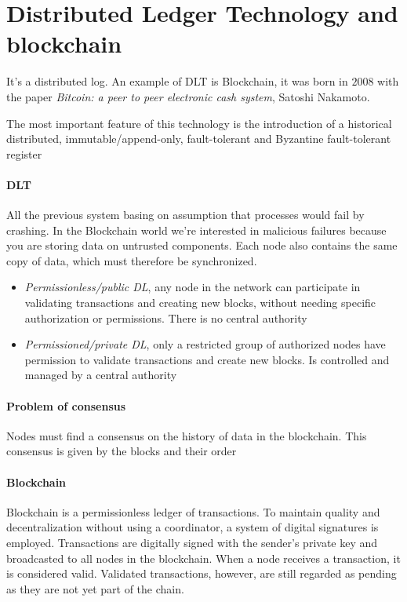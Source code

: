 \section{Distributed Ledger Technology and blockchain}
It’s a distributed log. An example of DLT is Blockchain, it was born in $2008$ with the paper \textit{Bitcoin: a peer to peer electronic cash system}, Satoshi Nakamoto.

The most important feature of this technology is the introduction of a historical distributed, immutable/append-only, fault-tolerant and Byzantine fault-tolerant register

\paragraph{DLT}
All the previous system basing on assumption that processes would fail by crashing. In the Blockchain world we're interested in malicious failures because you are storing data on untrusted components. Each node also contains the same copy of data, which must therefore be synchronized.

\begin{itemize}
    \item \textit{Permissionless/public DL}, any node in the network can participate in validating transactions and creating new blocks, without needing specific authorization or permissions. There is no central authority
    \item \textit{Permissioned/private DL}, only a restricted group of authorized nodes have permission to validate transactions and create new blocks. Is controlled and managed by a central authority
\end{itemize}

\paragraph{Problem of consensus}
Nodes must find a consensus on the history of data in the blockchain. This consensus is given by the blocks and their order

\paragraph{Blockchain}
Blockchain is a permissionless ledger of transactions. To maintain quality and decentralization without using a coordinator, a system of digital signatures is employed. Transactions are digitally signed with the sender's private key and broadcasted to all nodes in the blockchain. When a node receives a transaction, it is considered valid. Validated transactions, however, are still regarded as pending as they are not yet part of the chain.

